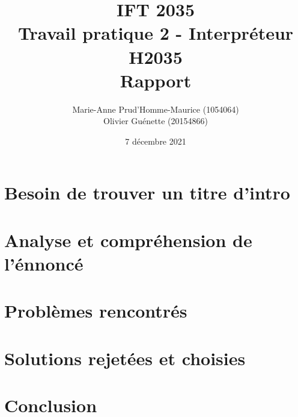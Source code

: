 \documentclass[12pt, letterpaper]{article}
\title{IFT 2035 \\ Travail pratique 2 - Interpréteur H2035 \\ Rapport }
\author{ Marie-Anne Prud'Homme-Maurice (1054064) 
\\ Olivier Guénette (20154866)}
\date{7 décembre 2021}
\begin{document}
\maketitle

\section*{Besoin de trouver un titre d'intro}

\section*{Analyse et compréhension de l'énnoncé}

\section*{Problèmes rencontrés}

\section*{Solutions rejetées et choisies}

\section*{Conclusion}
\end{document}
